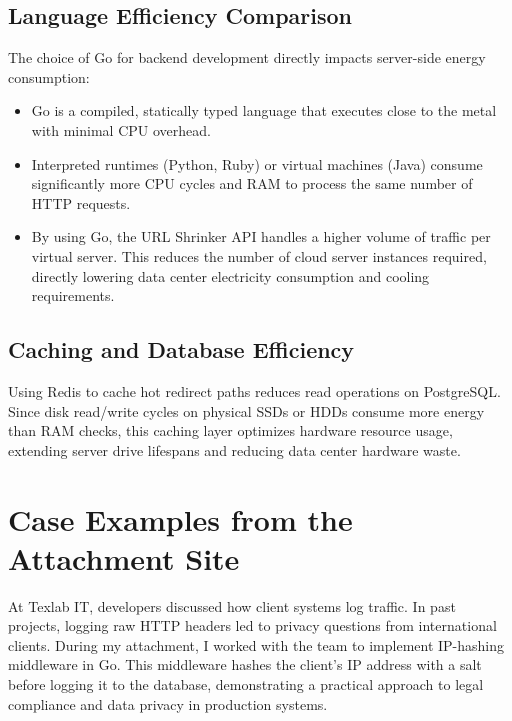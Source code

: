 \subsection{Language Efficiency Comparison}
The choice of Go for backend development directly impacts server-side energy consumption:
\begin{itemize}
    \item Go is a compiled, statically typed language that executes close to the metal with minimal CPU overhead.
    \item Interpreted runtimes (Python, Ruby) or virtual machines (Java) consume significantly more CPU cycles and RAM to process the same number of HTTP requests.
    \item By using Go, the URL Shrinker API handles a higher volume of traffic per virtual server. This reduces the number of cloud server instances required, directly lowering data center electricity consumption and cooling requirements.
\end{itemize}

\subsection{Caching and Database Efficiency}
Using Redis to cache hot redirect paths reduces read operations on PostgreSQL. Since disk read/write cycles on physical SSDs or HDDs consume more energy than RAM checks, this caching layer optimizes hardware resource usage, extending server drive lifespans and reducing data center hardware waste.

\section{Case Examples from the Attachment Site}
At Texlab IT, developers discussed how client systems log traffic. In past projects, logging raw HTTP headers led to privacy questions from international clients. During my attachment, I worked with the team to implement IP-hashing middleware in Go. This middleware hashes the client's IP address with a salt before logging it to the database, demonstrating a practical approach to legal compliance and data privacy in production systems.
